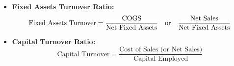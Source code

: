 \begin{formulabox}
\begin{itemize}[leftmargin=*, noitemsep]
    \item \textbf{Fixed Assets Turnover Ratio:}
    \begin{equation}
        \text{Fixed Assets Turnover} = \frac{\operatorname{COGS}}{\text{Net Fixed Assets}} \quad \text{or} \quad \frac{\text{Net Sales}}{\text{Net Fixed Assets}}
    \end{equation}

    \item \textbf{Capital Turnover Ratio:}
    \begin{equation}
        \text{Capital Turnover} = \frac{\text{Cost of Sales (or Net Sales)}}{\text{Capital Employed}}
    \end{equation}
\end{itemize}
\end{formulabox}

